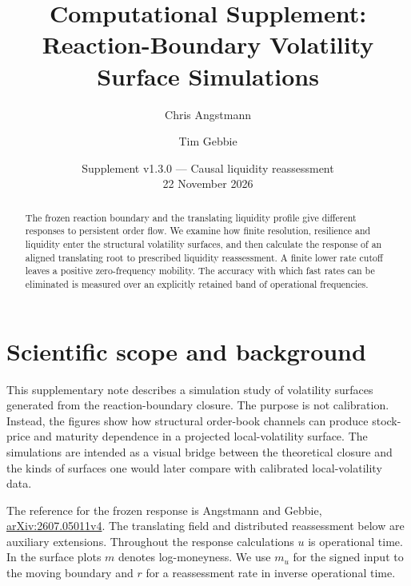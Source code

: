\documentclass[11pt]{article}
\title{Computational Supplement:\\Reaction-Boundary Volatility Surface Simulations}
\author{Chris Angstmann \and Tim Gebbie}
\date{Supplement v1.3.0 --- Causal liquidity reassessment\\22 November 2026}
\begin{document}
\maketitle

\begin{abstract}
The frozen reaction boundary and the translating liquidity profile give different
responses to persistent order flow. We examine how finite resolution,
resilience and liquidity enter the structural volatility surfaces, and then
calculate the response of an aligned translating root to prescribed liquidity
reassessment. A finite lower rate cutoff leaves a positive zero-frequency
mobility. The accuracy with which fast rates can be eliminated is measured
over an explicitly retained band of operational frequencies.
\end{abstract}
\tableofcontents

\section{Scientific scope and background}

This supplementary note describes a simulation study of volatility surfaces
generated from the reaction-boundary closure. The purpose is not calibration.
Instead, the figures show how structural order-book channels can produce
stock-price and maturity dependence in a projected local-volatility surface.
The simulations are intended as a visual bridge between the theoretical
closure and the kinds of surfaces one would later compare with calibrated
local-volatility data.

The reference for the frozen response is Angstmann and Gebbie,
\href{https://arxiv.org/abs/2607.05011v4}{arXiv:2607.05011v4}.
The translating field and distributed reassessment below are auxiliary
extensions. Throughout the response calculations \(u\) is operational
time. In the surface plots \(m\) denotes log-moneyness. We use \(m_u\)
for the signed input to the moving boundary and \(r\) for a reassessment
rate in inverse operational time.
\end{document}
